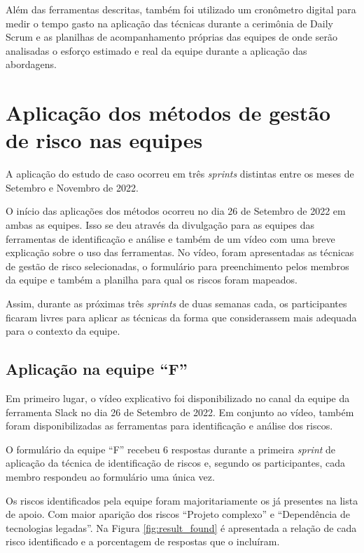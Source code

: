 \documentclass[
    12pt,       %
    openright,      %
    twoside,      %
    a4paper,      %
    english,      %
    french,       %
    spanish,      %
    brazil,       %
    ]{abntex2}
\begin{document}
Além das ferramentas descritas, também foi utilizado um cronômetro digital para medir o tempo gasto na aplicação das técnicas durante a cerimônia de Daily Scrum e as planilhas de acompanhamento próprias das equipes de onde serão analisadas o esforço estimado e real da equipe durante a aplicação das abordagens. 

\section{Aplicação dos métodos de gestão de risco nas equipes}

A aplicação do estudo de caso ocorreu em três \textit{sprints} distintas entre os meses de Setembro e Novembro de 2022.

O início das aplicações dos métodos ocorreu no dia 26 de Setembro de 2022 em ambas as equipes. Isso se deu através da divulgação para as equipes das ferramentas de identificação e análise e também de um vídeo com uma breve explicação sobre o uso das ferramentas. No vídeo, foram apresentadas as técnicas de gestão de risco selecionadas, o formulário para preenchimento pelos membros da equipe e também a planilha para qual os riscos foram mapeados.

Assim, durante as próximas três \textit{sprints} de duas semanas cada, os participantes ficaram livres para aplicar as técnicas da forma que considerassem mais adequada para o contexto da equipe. 

\subsection{Aplicação na equipe ``F''}

Em primeiro lugar, o vídeo explicativo foi disponibilizado no canal da equipe da ferramenta Slack no dia 26 de Setembro de 2022. Em conjunto ao vídeo, também foram disponibilizadas as ferramentas para identificação e análise dos riscos. 

O formulário da equipe ``F'' recebeu 6 respostas durante a primeira \textit{sprint} de aplicação da técnica de identificação de riscos e, segundo os participantes, cada membro respondeu ao formulário uma única vez. 

Os riscos identificados pela equipe foram majoritariamente os já presentes na lista de apoio. Com maior aparição dos riscos ``Projeto complexo'' e ``Dependência de tecnologias legadas''. Na Figura \ref{fig:result_found} é apresentada a relação de cada risco identificado e a porcentagem de respostas que o incluíram.
\end{document}
